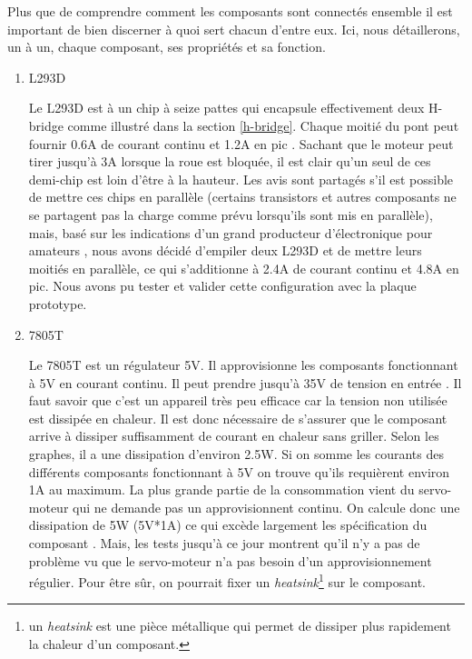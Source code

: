 \documentclass[a4paper,11pt]{report}
\begin{document}
{Plus que de comprendre comment les composants sont connectés ensemble il est important de bien discerner à quoi sert chacun d'entre eux. Ici, nous détaillerons, un à un, chaque composant, ses propriétés et sa fonction.


\begin{enumerate}
\item L293D

Le L293D est à un chip à seize pattes qui encapsule effectivement deux H-bridge comme illustré dans la section \ref{h-bridge}. Chaque moitié du pont peut fournir 0.6A de courant continu et 1.2A en pic \cite{l293dDataSheet}. Sachant que le moteur peut tirer jusqu'à 3A lorsque la roue est bloquée, il est clair qu'un seul de ces demi-chip est loin d'être à la hauteur. Les avis sont partagés s'il est possible de mettre ces chips en parallèle (certains transistors et autres composants ne se partagent pas la charge comme prévu lorsqu'ils sont mis en parallèle), mais, basé sur les indications d'un grand producteur d'électronique pour amateurs \cite{adafruitMotorShield}, nous avons décidé d'empiler deux L293D et de mettre leurs moitiés en parallèle, ce qui s'additionne à 2.4A de courant continu et 4.8A en pic. Nous avons pu tester et valider cette configuration avec la plaque prototype. 

\item 7805T

Le 7805T est un régulateur 5V. Il approvisionne les composants fonctionnant à 5V en courant continu. Il peut prendre jusqu'à 35V de tension en entrée \cite{7805T}. Il faut savoir que c'est un appareil très peu efficace car la tension non utilisée est dissipée en chaleur. Il est donc nécessaire de s'assurer que le composant arrive à dissiper suffisamment de courant en chaleur sans griller. Selon les graphes, il a une dissipation d'environ 2.5W. Si on somme les courants des différents composants fonctionnant à 5V on trouve qu'ils requièrent environ 1A au maximum. La plus grande partie de la consommation vient du servo-moteur qui ne demande pas un approvisionnent continu. On calcule donc une dissipation de 5W (5V*1A) ce qui excède largement les spécification du composant \cite{7805T}. Mais, les tests jusqu'à ce jour montrent qu'il n'y a pas de problème vu que le servo-moteur n'a pas besoin d'un approvisionnement régulier. Pour être sûr, on pourrait fixer un \textit{heatsink}\footnote{un \textit{heatsink} est une pièce métallique qui permet de dissiper plus rapidement la chaleur d'un composant.} sur le composant.


\end{enumerate}}
\end{document}
